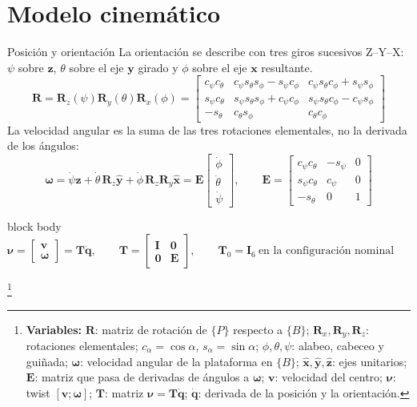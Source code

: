 \documentclass[aspectratio=169,10pt]{beamer}
\newcommand{\vect}[1]{\bm{#1}}
\newcommand{\variables}[1]{\begingroup\renewcommand{\thefootnote}{}\footnote[frame]{\textbf{Variables:} #1}\addtocounter{footnote}{-1}\endgroup}
\newcommand{\resultado}[1]{\par\smallskip\begin{beamercolorbox}[rounded=true,sep=0.45em,center]{block body}#1\end{beamercolorbox}\par\smallskip}
\begin{document}

\section{Modelo cinemático}

\begin{frame}{Posición y orientación}
\small
La orientación se describe con tres giros sucesivos Z--Y--X: $\psi$ sobre $\vect z$, $\theta$ sobre el eje $\vect y$ girado y $\phi$ sobre el eje $\vect x$ resultante.
\[
\vect R = \vect R_z(\psi)\vect R_y(\theta)\vect R_x(\phi) =
\begin{bmatrix}
c_\psi c_\theta & c_\psi s_\theta s_\phi - s_\psi c_\phi & c_\psi s_\theta c_\phi + s_\psi s_\phi\\
s_\psi c_\theta & s_\psi s_\theta s_\phi + c_\psi c_\phi & s_\psi s_\theta c_\phi - c_\psi s_\phi\\
-s_\theta & c_\theta s_\phi & c_\theta c_\phi
\end{bmatrix}
\]
La velocidad angular es la suma de las tres rotaciones elementales, no la derivada de los ángulos:
\[
\vect\omega = \dot\psi\hat{\vect z} + \dot\theta\,\vect R_z\hat{\vect y} + \dot\phi\,\vect R_z\vect R_y\hat{\vect x} = \vect E\begin{bmatrix}\dot\phi\\ \dot\theta\\ \dot\psi\end{bmatrix},
\qquad
\vect E = \begin{bmatrix}c_\psi c_\theta & -s_\psi & 0\\ s_\psi c_\theta & c_\psi & 0\\ -s_\theta & 0 & 1\end{bmatrix}
\]
\resultado{$\displaystyle \vect\nu = \begin{bmatrix}\vect v\\ \vect\omega\end{bmatrix} = \vect T\dot{\vect q},\qquad \vect T = \begin{bmatrix}\vect I & \vect 0\\ \vect 0 & \vect E\end{bmatrix},\qquad \vect T_0 = \vect I_6\ \text{en la configuración nominal}$}
\variables{$\vect R$: matriz de rotación de $\{P\}$ respecto a $\{B\}$; $\vect R_x, \vect R_y, \vect R_z$: rotaciones elementales; $c_\alpha = \cos\alpha$, $s_\alpha = \sin\alpha$; $\phi, \theta, \psi$: alabeo, cabeceo y guiñada; $\vect\omega$: velocidad angular de la plataforma en $\{B\}$; $\hat{\vect x}, \hat{\vect y}, \hat{\vect z}$: ejes unitarios; $\vect E$: matriz que pasa de derivadas de ángulos a $\vect\omega$; $\vect v$: velocidad del centro; $\vect\nu$: twist $[\vect v; \vect\omega]$; $\vect T$: matriz $\vect\nu = \vect T\dot{\vect q}$; $\dot{\vect q}$: derivada de la posición y la orientación.}
\end{frame}
\end{document}
